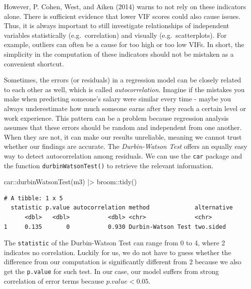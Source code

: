 \documentclass[
  letterpaper,
  DIV=11,
  numbers=noendperiod]{scrreprt}
\newenvironment{Shaded}{\begin{snugshade}}{\end{snugshade}}
\newcommand{\FunctionTok}[1]{\textcolor[rgb]{0.28,0.35,0.67}{#1}}
\newcommand{\NormalTok}[1]{\textcolor[rgb]{0.00,0.23,0.31}{#1}}
\newcommand{\SpecialCharTok}[1]{\textcolor[rgb]{0.37,0.37,0.37}{#1}}
\begin{document}
However, P. Cohen, West, and Aiken (2014) warns to not rely on these
indicators alone. There is sufficient evidence that lower VIF scores
could also cause issues. Thus, it is always important to still
investigate relationships of independent variables statistically
(e.g.~correlation) and visually (e.g.~scatterplots). For example,
outliers can often be a cause for too high or too low VIFs. In short,
the simplicity in the computation of these indicators should not be
mistaken as a convenient shortcut.

Sometimes, the errors (or residuals) in a regression model can be
closely related to each other as well, which is called
\emph{autocorrelation}. Imagine if the mistakes you make when predicting
someone's salary were similar every time - maybe you always
underestimate how much someone earns after they reach a certain level or
work experience. This pattern can be a problem because regression
analysis assumes that these errors should be random and independent from
one another. When they are not, it can make our results unreliable,
meaning we cannot trust whether our findings are accurate. The
\emph{Durbin-Watson Test} offers an equally easy way to detect
autocorrelation among residuals. We can use the \texttt{car} package and
the function \texttt{durbinWatsonTest()} to retrieve the relevant
information.

\begin{Shaded}
\begin{Highlighting}[]
\NormalTok{car}\SpecialCharTok{::}\FunctionTok{durbinWatsonTest}\NormalTok{(m3) }\SpecialCharTok{|\textgreater{}}
\NormalTok{  broom}\SpecialCharTok{::}\FunctionTok{tidy}\NormalTok{()}
\end{Highlighting}
\end{Shaded}

\begin{verbatim}
# A tibble: 1 x 5
  statistic p.value autocorrelation method             alternative
      <dbl>   <dbl>           <dbl> <chr>              <chr>      
1     0.135       0           0.930 Durbin-Watson Test two.sided  
\end{verbatim}

The \texttt{statistic} of the Durbin-Watson Test can range from 0 to 4,
where 2 indicates no correlation. Luckily for us, we do not have to
guess whether the difference from our computation is significantly
different from 2 because we also get the \texttt{p.value} for such test.
In our case, our model suffers from strong correlation of error terms
because \(p.value < 0.05\).
\end{document}

